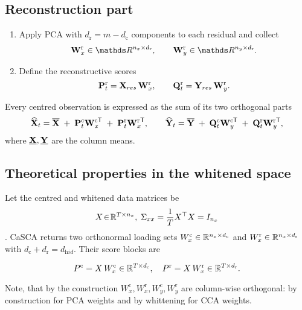 \documentclass[14pt]{extarticle}
\begin{document}
	\subsection*{Reconstruction part}
	
	\begin{enumerate}[leftmargin=1.4cm,label=(R\arabic*)]
		\item
		Apply PCA with \(d_{\mathrm r}=m-d_{\mathrm c}\) components to each
		residual and collect
		\[
		\bW_x^{\mathrm r}\in\dR^{n_x\times d_{\mathrm r}},
		\qquad
		\bW_y^{\mathrm r}\in\dR^{n_y\times d_{\mathrm r}}.
		\]
		\item
		Define the reconstructive scores
		\[
		\mathbf{P}_t^{\mathrm r}= \mathbf{X}_{res}\,\mathbf{W}_x^{\mathrm r},
		\qquad
		\mathbf{Q}_t^{\mathrm r}= \mathbf{Y}_{res}\,\mathbf{W}_y^{\mathrm r}.
		\]
	\end{enumerate}
	
	
	Every centred observation is expressed as the sum of its two
	orthogonal parts
	\[
	\widehat{\mathbf{X}}_t
	=\overline{\mathbf{X}}
	\;+\;
	\mathbf{P}_t^{\mathrm c}{\mathbf{W}_x^{\mathrm c}}^{\!\mathsf T}
	\;+\;
	\mathbf{P}_t^{\mathrm r}{\mathbf{W}_x^{\mathrm r}}^{\!\mathsf T},
	\qquad
	\widehat{\mathbf{Y}}_t
	=\overline{\mathbf{Y}}
	\;+\;
	\mathbf{Q}_t^{\mathrm c}{\mathbf{W}_y^{\mathrm c}}^{\!\mathsf T}
	\;+\;
	\mathbf{Q}_t^{\mathrm r}{\mathbf{W}_y^{\mathrm r}}^{\!\mathsf T},
	\]
	where \(\underline{\mathbf{X}},\underline{\mathbf{Y}}\) are the column means.
	
	\subsection*{Theoretical properties in the whitened space}
	Let the centred and whitened data matrices be
	\[
	X\!\in\!\mathbb{R}^{T\times n_x},\;
	\Sigma_{xx}=\frac{1}{T}X^{\top}X = I_{n_x}
	\].
	CaSCA returns two orthonormal loading sets  
	\(W_x^{\mathrm c}\in\mathbb{R}^{n_x\times d_{\mathrm c}}\)  
	and \(W_x^{\mathrm r}\in\mathbb{R}^{n_x\times d_{\mathrm r}}\)
	with \(d_{\mathrm c}+d_{\mathrm r}=d_{\mathrm hid}\).
	Their score blocks are
	
	\[
	P^{\mathrm c}=X\,W_x^{\mathrm c}\in\mathbb{R}^{T\times d_{\mathrm c}},
	\quad
	P^{\mathrm r}=X\,W_x^{\mathrm r}\in\mathbb{R}^{T\times d_{\mathrm r}}.
	\]
	
	Note, that by the construction $W_x^{\mathrm c}, W_x^{\mathrm r}, W_y^{\mathrm c}, W_y^{\mathrm r}$ are column-wise orthogonal: by construction for PCA weights and by whittening for CCA weights.
	
\end{document}
